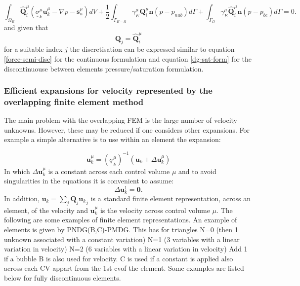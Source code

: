 \begin{equation}
\int_{\Omega_E} \hat{\mathbf Q}_i^\mu ({\underline{\underline{\sigma}}}_k^\mu {\mathbf u}_k^\mu - \nabla p -{\mathbf s}_u^\mu) dV
+  \frac{1}{2}\int_{\Gamma_{E-\Omega}} \gamma^\mu_E {\mathbf Q}_i^\mu {\mathbf n} (p - p_{nab}) d\Gamma
+  \int_{\Gamma_{\Omega}}  \gamma^\mu_E \hat{\mathbf Q}_i^\mu {\mathbf n} (p - p_{bc}) d\Gamma =0.
\label{overlap-eqn-dg}
\end{equation}
and given that
\begin{equation}
{\mathbf Q}_j=\hat{\mathbf Q}_i^\mu
\end{equation}
for a suitable index $j$ the discretisation can be expressed
similar to equation \ref{force-semi-disc} for the continuous formulation and
equation \ref{dg-sat-form} for the discontinuouse
between elements pressure/saturation formulation.


\subsubsection{Efficient expansions for velocity represented by the overlapping finite element method}
The main problem with the overlapping FEM is the large number of velocity unknowns.
However, these may be reduced if one considers other expansions.
For example a simple alternative is to use within an element the expansion:

\begin{equation}
 {\mathbf u}_k^\mu = ({\underline{\underline{\sigma}}}_k^\mu)^{-1}  ({\mathbf u}_k + \Delta{\mathbf u}_k^\mu)
\end{equation}
In which $\Delta{\mathbf u}_k^\mu$ is a constant across each control volume $\mu$ and to avoid singularities
in the equations it is convenient to assume:
\begin{equation}
\Delta{\mathbf u}_k^1={\mathbf 0}.
\end{equation}
In addition,
${\mathbf u}_k =\sum_j {\mathbf Q}_j {{\mathbf u}_k}_j$ is a
standard finite element representation, across an element, of the
velocity and ${\mathbf u}_k^\mu$ is the velocity across control volume $\mu$.
The following are some examples of finite element representations.
An example of elements is given by
PNDG(B,C)-PMDG.
This has for triangles
N=0 (then 1 unknown associated with a constant variation)
N=1 (3 variables with a linear variation in velocity)
N=2 (6 variables with a linear variation in velocity)
Add 1 if a bubble B is also used for velocity.
C is used if a constant is applied also across each CV appart from the 1st cvof the element.
Some examples are listed below for fully discontinuous elements.


